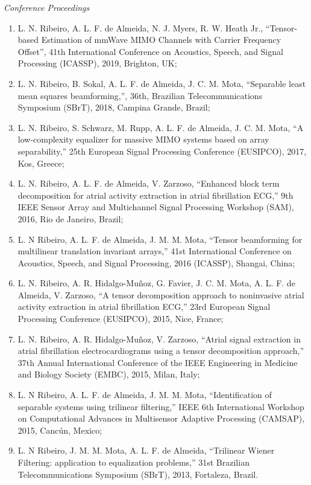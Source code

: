 {\sl Conference Proceedings}

\begin{enumerate}
	\item L. N. Ribeiro, A. L. F. de Almeida, N. J. Myers, R. W. Heath Jr., ``Tensor-based Estimation of mmWave MIMO Channels with Carrier Frequency Offset'', 41th International Conference on Acoustics, Speech, and Signal Processing (ICASSP), 2019, Brighton, UK;
	
	\item L. N. Ribeiro, B. Sokal, A. L. F. de Almeida, J. C. M. Mota, ``Separable least mean squares beamforming,'', 36th, Brazilian Telecommunications Symposium (SBrT), 2018, Campina Grande, Brazil;
	
	\item L. N. Ribeiro, S. Schwarz, M. Rupp, A. L. F. de Almeida, J. C. M. Mota, ``A low-complexity equalizer for massive MIMO systems based on array separability,'' 25th European Signal Processing Conference (EUSIPCO), 2017, Kos, Greece;
	
	\item L. N. Ribeiro, A. L. F. de Almeida, V. Zarzoso, ``Enhanced block term decomposition for atrial activity extraction in atrial fibrillation ECG,'' 9th IEEE Sensor Array and Multichannel Signal Processing Workshop (SAM), 2016, Rio de Janeiro, Brazil;
	
	\item L. N Ribeiro,  A. L. F. de Almeida, J. M. M. Mota, ``Tensor beamforming for multilinear translation invariant arrays,'' 41st International Conference on Acoustics, Speech, and Signal Processing, 2016 (ICASSP), Shangai, China;
	
	\item  L. N. Ribeiro, A. R. Hidalgo-Mu\~{n}oz, G. Favier, J. C. M. Mota, A. L. F. de Almeida,  V. Zarzoso, ``A tensor decomposition approach to noninvasive atrial activity extraction in atrial fibrillation ECG,'' 23rd European Signal Processing Conference (EUSIPCO), 2015, Nice, France;
	
	\item L. N. Ribeiro, A. R. Hidalgo-Mu\~{n}oz, V. Zarzoso, ``Atrial signal extraction in atrial fibrillation electrocardiograms using a tensor decomposition approach,'' 37th Annual International Conference of the IEEE Engineering in Medicine and Biology Society (EMBC), 2015, Milan, Italy;
	
	 \item L. N Ribeiro,  A. L. F. de Almeida, J. M. M. Mota, ``Identification of separable systems using trilinear filtering,'' IEEE 6th International Workshop on Computational Advances in Multisensor Adaptive Processing (CAMSAP), 2015, Canc\'{u}n, Mexico;
	
	 \item L. N Ribeiro, J. M. M. Mota, A. L. F. de Almeida, ``Trilinear Wiener Filtering: application to equalization problems,''  31st Brazilian Telecommunications Symposium (SBrT), 2013, Fortaleza, Brazil.
\end{enumerate}